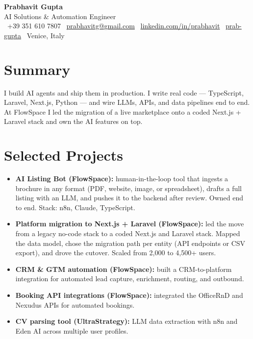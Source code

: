 \documentclass[a4paper,10pt]{article}
\begin{document}
\begin{center}
 {\Huge\bfseries Prabhavit Gupta}\\[3pt]
 {\color{accent}\large AI Solutions \& Automation Engineer}\\[5pt]
 \faPhone\ +39 351 610 7807 \quad
 \faEnvelope\ \href{mailto:prabhavitg@gmail.com}{prabhavitg@gmail.com} \quad
 \faLinkedin\ \href{https://www.linkedin.com/in/prabhavit/}{linkedin.com/in/prabhavit} \quad
 \faGithub\ \href{https://github.com/prab-gupta}{prab-gupta} \quad
 \faMapMarker*\ Venice, Italy
\end{center}

\section{Summary}
I build AI agents and ship them in production. I write real code — TypeScript, Laravel, Next.js, Python — and wire LLMs, APIs, and data pipelines end to end. At FlowSpace I led the migration of a live marketplace onto a coded Next.js + Laravel stack and own the AI features on top.

\section{Selected Projects}
\begin{itemize}
 \item \textbf{AI Listing Bot (FlowSpace):} human-in-the-loop tool that ingests a brochure in any format (PDF, website, image, or spreadsheet), drafts a full listing with an LLM, and pushes it to the backend after review. Owned end to end. Stack: n8n, Claude, TypeScript.
 \item \textbf{Platform migration to Next.js + Laravel (FlowSpace):} led the move from a legacy no-code stack to a coded Next.js and Laravel stack. Mapped the data model, chose the migration path per entity (API endpoints or CSV export), and drove the cutover. Scaled from 2,000 to 4,500+ users.
 \item \textbf{CRM \& GTM automation (FlowSpace):} built a CRM-to-platform integration for automated lead capture, enrichment, routing, and outbound.
 \item \textbf{Booking API integrations (FlowSpace):} integrated the OfficeRnD and Nexudus APIs for automated bookings.
 \item \textbf{CV parsing tool (UltraStrategy):} LLM data extraction with n8n and Eden AI across multiple user profiles.
\end{itemize}
\end{document}
